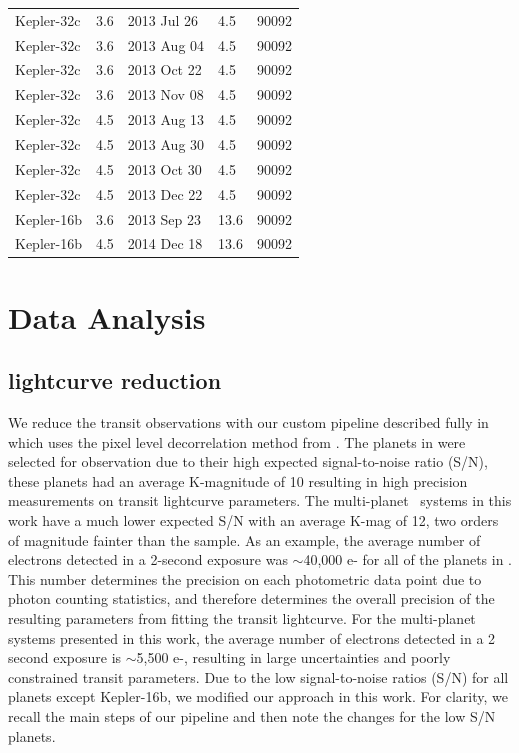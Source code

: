 {\begin{longtable}[h]{lllll}
Kepler-32c &               3.6 &   2013 Jul 26 &         4.5 &       90092 \\
Kepler-32c &               3.6 &   2013 Aug 04 &         4.5 &       90092 \\
Kepler-32c &               3.6 &   2013 Oct 22 &         4.5 &       90092 \\
Kepler-32c &               3.6 &   2013 Nov 08 &         4.5 &       90092 \\

Kepler-32c &               4.5 &   2013 Aug 13 &         4.5 &       90092 \\
Kepler-32c &               4.5 &   2013 Aug 30 &         4.5 &       90092 \\
Kepler-32c &               4.5 &   2013 Oct 30 &         4.5 &       90092 \\
Kepler-32c &               4.5 &   2013 Dec 22 &         4.5 &       90092 \\

Kepler-16b &               3.6 &   2013 Sep 23 &        13.6 &       90092 \\
Kepler-16b &               4.5 &   2014 Dec 18 &        13.6 &       90092 \\
\end{longtable}
}

\section{Data Analysis}
\label{P4:sec:analysis}
\subsection{\spitzerIRAC lightcurve reduction}

We reduce the \spitzerIRAC transit observations with our custom pipeline described fully in \citet{Baxter2021} which uses the pixel level decorrelation method from \citep{Deming2015}. The planets in \citet{Baxter2021} were selected for observation due to their high expected signal-to-noise ratio (S/N), these planets had an average K-magnitude of 10 resulting in high precision measurements on transit lightcurve parameters. The multi-planet \Kepler~systems in this work have a much lower expected S/N with an average K-mag of 12, two orders of magnitude fainter than the \citet{Baxter2021} sample. As an example, the average number of electrons detected in a 2-second exposure was $\sim$40,000 e- for all of the planets in \citet{Baxter2021}. This number determines the precision on each photometric data point due to photon counting statistics, and therefore determines the overall precision of the resulting parameters from fitting the transit lightcurve. For the multi-planet systems presented in this work, the average number of electrons detected in a 2 second exposure is $\sim$5,500 e-, resulting in large uncertainties and poorly constrained transit parameters. Due to the low signal-to-noise ratios (S/N) for all planets except Kepler-16b, we modified our approach in this work. For clarity, we recall the main steps of our pipeline and then note the changes for the low S/N planets.

